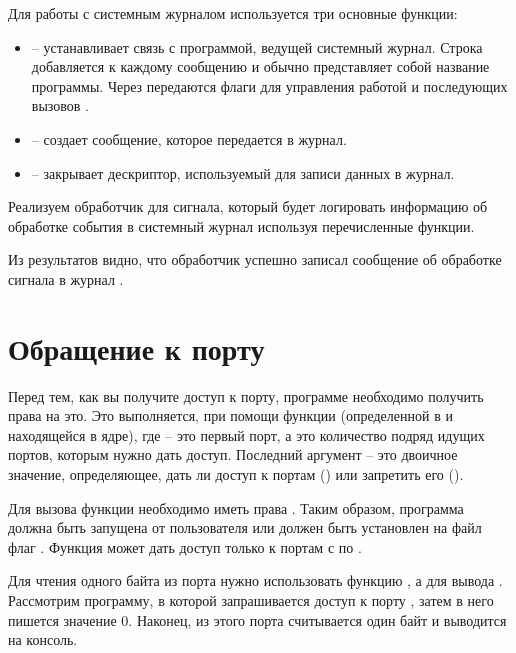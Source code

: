 Для работы с системным журналом используется три основные функции:
\begin{itemize}
	\item {} -- устанавливает связь с программой, ведущей системный журнал. Строка  добавляется к каждому сообщению и обычно представляет собой название программы. Через  передаются флаги для управления работой  и последующих вызовов .
	\item {} -- создает сообщение, которое передается в журнал.
	\item {} -- закрывает дескриптор, используемый для записи данных в журнал.
\end{itemize}

Реализуем обработчик для сигнала, который будет логировать информацию об обработке события в системный журнал используя перечисленные функции.


Из результатов видно, что обработчик успешно записал сообщение об обработке сигнала в журнал .

\section{Обращение к порту}

Перед тем, как вы получите доступ к порту, программе необходимо получить права на это. Это выполняется, при помощи функции  (определенной в  и находящейся в ядре), где  -- это первый порт, а  это количество подряд идущих портов, которым нужно дать доступ. Последний аргумент -- это двоичное значение, определяющее, дать ли доступ к портам () или запретить его ().

Для вызова функции  необходимо иметь права . Таким образом, программа должна быть запущена от пользователя  или должен быть установлен на файл флаг . Функция  может дать доступ только к портам с  по .

Для чтения одного байта из порта нужно использовать функцию , а для вывода . Рассмотрим программу, в которой запрашивается доступ к порту , затем в него пишется значение 0. Наконец, из этого порта считывается один байт и выводится на консоль.

